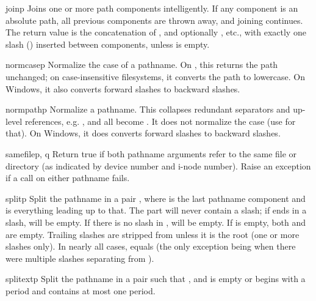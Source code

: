 \begin{funcdesc}{join}{p}
Joins one or more path components intelligently.  If any component is
an absolute path, all previous components are thrown away, and joining
continues.  The return value is the concatenation of , and
optionally , etc., with exactly one slash () inserted
between components, unless  is empty.
\end{funcdesc}

\begin{funcdesc}{normcase}{p}
Normalize the case of a pathname.  On \UNIX{}, this returns the path
unchanged; on case-insensitive filesystems, it converts the path to
lowercase.  On Windows, it also converts forward slashes to backward
slashes.
\end{funcdesc}

\begin{funcdesc}{normpath}{p}
Normalize a pathname.  This collapses redundant separators and
up-level references, e.g. ,  and
 all become .  It does not normalize the
case (use  for that).  On Windows, it does
converts forward slashes to backward slashes.
\end{funcdesc}

\begin{funcdesc}{samefile}{p, q}
Return true if both pathname arguments refer to the same file or
directory (as indicated by device number and i-node number).
Raise an exception if a  call on either pathname
fails.
\end{funcdesc}

\begin{funcdesc}{split}{p}
Split the pathname  in a pair ,
where  is the last pathname component and  is
everything leading up to that.  The  part will never contain
a slash; if  ends in a slash,  will be empty.  If
there is no slash in ,  will be empty.  If  is
empty, both  and  are empty.  Trailing slashes are
stripped from  unless it is the root (one or more slashes
only).  In nearly all cases, 
equals  (the only exception being when there were multiple
slashes separating  from ).
\end{funcdesc}

\begin{funcdesc}{splitext}{p}
Split the pathname  in a pair 
such that ,
and  is empty or begins with a period and contains
at most one period.
\end{funcdesc}

